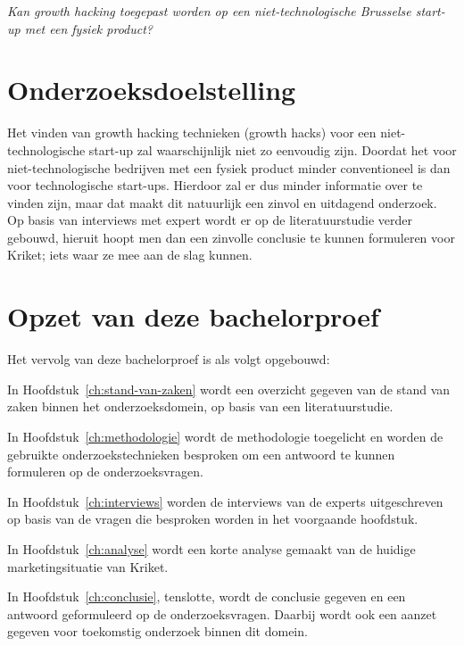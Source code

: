 \emph{Kan growth hacking toegepast worden op een niet-technologische Brusselse start-up met een fysiek product?}

\section{Onderzoeksdoelstelling}
\label{sec:onderzoeksdoelstelling}

Het vinden van growth hacking technieken (growth hacks) voor een niet-technologische start-up zal waarschijnlijk niet zo eenvoudig zijn. Doordat het voor niet-technologische bedrijven met een fysiek product minder conventioneel is dan voor technologische start-ups. Hierdoor zal er dus minder informatie over te vinden zijn, maar dat maakt dit natuurlijk een zinvol en uitdagend onderzoek. Op basis van interviews met expert wordt er op de literatuurstudie verder gebouwd, hieruit hoopt men dan een zinvolle conclusie te kunnen formuleren voor Kriket; iets waar ze mee aan de slag kunnen.

\section{Opzet van deze bachelorproef}
\label{sec:opzet-bachelorproef}


Het vervolg van deze bachelorproef is als volgt opgebouwd:

In Hoofdstuk~\ref{ch:stand-van-zaken} wordt een overzicht gegeven van de stand van zaken binnen het onderzoeksdomein, op basis van een literatuurstudie.

In Hoofdstuk~\ref{ch:methodologie} wordt de methodologie toegelicht en worden de gebruikte onderzoekstechnieken besproken om een antwoord te kunnen formuleren op de onderzoeksvragen.

In Hoofdstuk~\ref{ch:interviews} worden de interviews van de experts uitgeschreven op basis van de vragen die besproken worden in het voorgaande hoofdstuk.

In Hoofdstuk~\ref{ch:analyse} wordt een korte analyse gemaakt van de huidige marketingsituatie van Kriket.

In Hoofdstuk~\ref{ch:conclusie}, tenslotte, wordt de conclusie gegeven en een antwoord geformuleerd op de onderzoeksvragen. Daarbij wordt ook een aanzet gegeven voor toekomstig onderzoek binnen dit domein.

